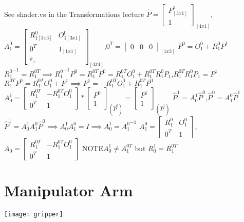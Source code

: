 \documentclass{article}
\begin{document}
See shader.vs in the Transformations lecture
\newline
\newline
$\hat{P} = 
\begin{bmatrix}
P_{[3x1]}^1 \\
1
\end{bmatrix}_{[4x1]}$,\space$A_1^0 = \begin{bmatrix}
R_{1 [3x3]}^0 & O_{1 [3x1]}^0 \\
0^T & 1_{[1x1]}\\
\varepsilon_z
\end{bmatrix}_{[4x4]}$,\space$0^T = \begin{bmatrix}
0 & 0 & 0
\end{bmatrix}_{[1x3]}$
\newline
\newline
$P^0 = O_1^0 + R_1^0P^1$
\newline
${R_1^{0}}^{-1} = R_1^{0 T} \implies {R_1^{0}}^{-1}P^0 = R_1^{0 T}P^0 = R_1^{0 T}O_1^0 + R_1^{0 T}R_1^0P_1$,\space$R_1^{0 T}R_1^0P_1 =  P^1$
$R_1^{0 T}P^0 = R_1^{0 T}O_1^0 + P^1 \implies P^1 = -R_1^{0 T}O_1^0 + R_1^{0 T}P^0$
\newline
\newline
$A_0^1 = \begin{bmatrix}
R_1^{0 T} & -R_1^{0 T}O_1^0 \\
0^T & 1
\end{bmatrix} * \begin{bmatrix}
P^0 \\
1
\end{bmatrix}_{(\hat{P}^0)} = \begin{bmatrix}
P^1 \\
1
\end{bmatrix}_{(\hat{P}^1)}$
\newline
\newline
$\hat{P}^1 = A_0^1\hat{P}^0$,\space$\hat{P}^0 = A_1^0\hat{P}^1$
$\hat{P}^1 = A_0^1A_1^0\hat{P}^0 \implies A_0^1A_1^0 = I \implies A_0^1 = {A_1^0}^{-1}$
\newline
\newline
$A_1^0 = \begin{bmatrix}
R_1^0 & O_1^0 \\
0^T & 1
\end{bmatrix}$,\space$A_0 = \begin{bmatrix}
R_1^{0T} & -R_1^{0 T}O_1^0 \\
0^T & 1
\end{bmatrix}$
\newline
\newline
NOTE\space$A_0^1 \not= A_1^{0 T}$ but $R_0^1 = R_1^{0 T}$

\section{Manipulator Arm}
\texttt{[image: gripper]}
\end{document}
